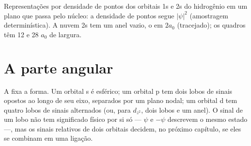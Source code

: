 \begin{omfigure}
\hspace{0.12\linewidth}%

{\small Representações por densidade de pontos dos orbitais 1s e 2s do
hidrogênio em um plano que passa pelo núcleo: a densidade de pontos segue
$|\psi|^2$ (amostragem determinística). A nuvem 2s tem um anel vazio, o  em $2a_0$ (tracejado); os quadros têm 12 e 28 $a_0$ de largura.}
\end{omfigure}

\section{A parte angular}

A  fixa a forma. Um orbital s é esférico; um orbital p tem dois
lobos de sinais opostos ao longo de seu eixo, separados por um plano nodal; um
orbital d tem quatro lobos de sinais alternados (ou, para $d_{z^2}$, dois lobos
e um anel). O sinal de um lobo não tem significado físico por si só --- $\psi$
e $-\psi$ descrevem o mesmo estado ---, mas os sinais relativos de dois
orbitais decidem, no próximo capítulo, se eles se combinam em uma ligação.


